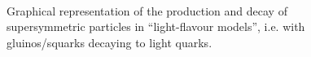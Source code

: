 \begin{figure}[h!]
  \begin{center}
     ~~
    \caption{
      Graphical representation of the production and decay of supersymmetric particles 
      in ``light-flavour models'', i.e. with gluinos/squarks decaying to light quarks. 
    }
    \label{fig:simplified-models-feyn-light}
  \end{center}
\end{figure}


